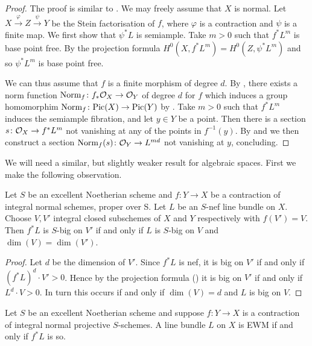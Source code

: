 	\begin{proof}
	The proof is similar to \cite[Lemma 2.10]{Keel}.	
	We may freely assume that $X$ is normal. 
	Let $X \xrightarrow{\varphi} Z \xrightarrow{\psi} Y$ be the Stein factorisation of $f$, where $\varphi$ is a contraction and $\psi$ is a finite map. 
	We first show that $\psi^*L$ is semiample. Take $m>0$ such that $f^*L^{ m}$ is base point free. By the projection formula $H^0(X, f^*L^{m})=H^0(Z, \psi^*L^{m})$ and so $\psi^*L^{m}$ is base point free.
	
	We can thus assume that $f$ is a finite morphism of degree $d$.
	By , there exists a norm function $\textup{Norm}_f \colon f_*\mathcal{O}_X \to \mathcal{O}_Y$ of degree $d$ for $f$ which induces a group homomorphim $\textup{Norm}_f \colon \text{Pic}(X) \to \text{Pic}(Y)$ by . Take $m>0$ such that $f^*L^{m}$ induces the semiample fibration, and let $y\in Y$ be a point. Then there is a section $s\colon \mathcal{O}_X\to f^*L^{m}$ not vanishing at any of the points in $f^{-1}(y)$. By  and  we then construct a section $\textup{Norm}_f(s)\colon \mathcal{O}_{Y}\to L^{md}$ not vanishing at $y$, concluding.
	
\end{proof}

	We will need a similar, but slightly weaker result for algebraic spaces. First we make the following observation.

	\begin{lemma}\label{com-big}
	Let $S$ be an excellent Noetherian scheme and $f \colon Y \to X$ be a contraction of integral normal schemes, proper over S. Let $L$ be an $S$-nef line bundle on $X$. Choose $V,V'$ integral closed subschemes of $X$ and $Y$ respectively with $f(V')=V$. Then $f^{*}L$ is $S$-big on $V'$ if and only if $L$ is $S$-big on $V$ and $\dim (V)=\dim (V')$.  
	\end{lemma}

	\begin{proof}
	
	Let $d$ be the dimension of $V'$. Since $f^{*}L$ is nef, it is big on $V'$ if and only if $(f^{*}L)^{d} \cdot V'>0$.
	Hence by the projection formula (\cite[Proposition VI.2.11]{k-rat-curves}) it is big on $V'$ if and only if $L^{d} \cdot V> 0$. In turn this occurs if and only if $\dim (V) =d$ and $L$ is big on $V$.
\end{proof}

\begin{lemma}\label{pp-EWM}
	Let $S$ be an excellent Noetherian scheme and suppose $f \colon Y\to X$ is a contraction of integral normal projective $S$-schemes.
	A line bundle $L$ on $X$ is EWM if and only if $f^{*}L$ is so.	
\end{lemma}

